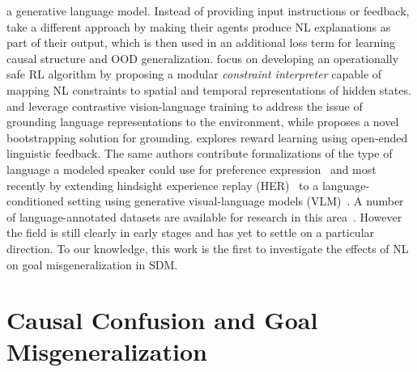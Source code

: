 \documentclass[../main.tex]{subfiles}
\begin{document}
a generative language model. Instead of providing input instructions or feedback,
\citet{lampinen_tell_2022} take a different approach by making their agents produce NL explanations
as part of their output, which is then used in an additional loss term for learning causal structure
and OOD generalization.  focus on developing an operationally safe RL
algorithm by proposing a modular \textit{constraint interpreter} capable of mapping NL constraints
to spatial and temporal representations of hidden states.  and
\citet{fan_minedojo_2022} leverage contrastive vision-language training to address the issue of
grounding language representations to the environment, while \citet{watkins_teachable_2021} proposes
a novel bootstrapping solution for grounding.  explores reward learning
using open-ended linguistic feedback. The same authors contribute formalizations of the type of
language a modeled speaker could use for preference expression~\citep{sumers_how_2022} and most
recently by extending hindsight experience replay (HER)~\citep{andrychowicz_hindsight_2017} to
a language-conditioned setting using generative visual-language models (VLM)~\citep{alayrac_flamingo_2022}. A number of language-annotated datasets are available for research in
this area~\citep{zholus_iglu_2022, mees_calvin_2022, fan_minedojo_2022, shridhar_alfred_2020,
	jiang_yunfan_vima_2022, liu_reinforcement_2022}. However the field is still clearly in early stages
and has yet to settle on a particular direction. To our knowledge, this work is the first to
investigate the effects of NL on goal misgeneralization in SDM.

\section{Causal Confusion and Goal Misgeneralization}
\end{document}
